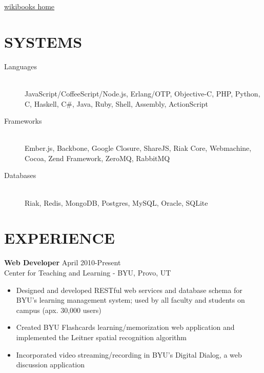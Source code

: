 \documentclass[margin]{res}
\begin{document}
 


  \address{\bf  377 N 750 E\\Provo, UT 84606\\(801) 803-8577}
  \address{bytheway.cameron@gmail.com\\LinkedIn: \\
           Github: http://github.com/CamShaft}
  \href{http://www.wikibooks.org}{wikibooks home}
  \begin{resume}

    \section{SYSTEMS}
      \begin{description}
        \item[Languages] \hfill \\
        JavaScript/CoffeeScript/Node.js, Erlang/OTP, Objective-C, PHP, Python, 
        C, Haskell, C\#, Java, Ruby, Shell, Assembly, ActionScript
        \item[Frameworks] \hfill \\
        Ember.js, Backbone, Google Closure, ShareJS, Riak Core, Webmachine, 
        Cocoa, Zend Framework, ZeroMQ, RabbitMQ
        \item[Databases] \hfill \\
        Riak, Redis, MongoDB, Postgres, MySQL, Oracle, SQLite
      \end{description}

    \section{EXPERIENCE}
      {\bf Web Developer} \hfill April 2010-Present \\
      Center for Teaching and Learning - BYU, Provo, UT
      \begin{itemize} \itemsep -2pt
        \item Designed and developed RESTful web services and database
         schema for BYU's learning management system; used by all 
         faculty and students on campus (apx. 30,000 users)
        \item Created BYU Flashcards learning/memorization web 
        application and implemented the Leitner spatial recognition 
        algorithm
        \item Incorporated video streaming/recording in BYU's Digital 
        Dialog, a web discussion application
      \end{itemize}


\end{resume}
\end{document}
